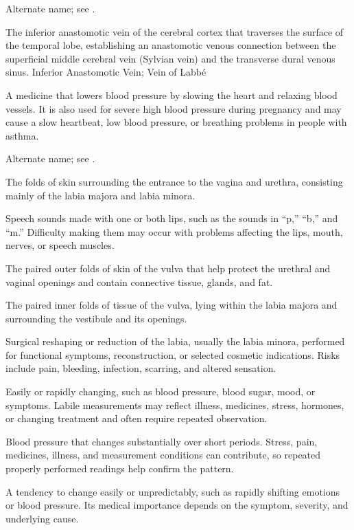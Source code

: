  Alternate name; see .

 The inferior anastomotic vein of the cerebral cortex that traverses the surface of the temporal lobe, establishing an anastomotic venous connection between the superficial middle cerebral vein (Sylvian vein) and the transverse dural venous sinus.
\synonyms
Inferior Anastomotic Vein; Vein of Labbé

 A medicine that lowers blood pressure by slowing the heart and relaxing blood vessels. It is also used for severe high blood pressure during pregnancy and may cause a slow heartbeat, low blood pressure, or breathing problems in people with asthma.

 Alternate name; see .

 The folds of skin surrounding the entrance to the vagina and urethra, consisting mainly of the labia majora and labia minora.

 Speech sounds made with one or both lips, such as the sounds in “p,” “b,” and “m.” Difficulty making them may occur with problems affecting the lips, mouth, nerves, or speech muscles.

 The paired outer folds of skin of the vulva that help protect the urethral and vaginal openings and contain connective tissue, glands, and fat.

 The paired inner folds of tissue of the vulva, lying within the labia majora and surrounding the vestibule and its openings.

 Surgical reshaping or reduction of the labia, usually the labia minora, performed for functional symptoms, reconstruction, or selected cosmetic indications. Risks include pain, bleeding, infection, scarring, and altered sensation.

 Easily or rapidly changing, such as blood pressure, blood sugar, mood, or symptoms. Labile measurements may reflect illness, medicines, stress, hormones, or changing treatment and often require repeated observation.

 Blood pressure that changes substantially over short periods. Stress, pain, medicines, illness, and measurement conditions can contribute, so repeated properly performed readings help confirm the pattern.

 A tendency to change easily or unpredictably, such as rapidly shifting emotions or blood pressure. Its medical importance depends on the symptom, severity, and underlying cause.

